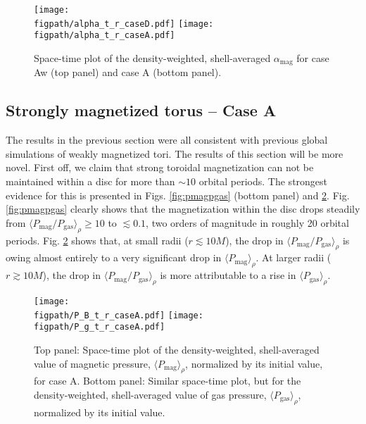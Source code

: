 \documentclass[useAMS,usenatbib]{mn2e}
\newcommand{\figpath}{.}
\def\pm{P_\mathrm{mag}}
\def\pg{P_\mathrm{gas}}
\def\pmpg{P_\mathrm{mag}/P_\mathrm{gas}}
\begin{document}
\begin{figure}
\centering
\texttt{[image: \\figpath/alpha\_t\_r\_caseD.pdf]}
\texttt{[image: \\figpath/alpha\_t\_r\_caseA.pdf]}
\caption{Space-time plot of the density-weighted, shell-averaged $\alpha_\mathrm{mag}$ for case Aw (top panel) and case A (bottom panel).}
\label{fig:alpha}
\end{figure}


\subsection{Strongly magnetized torus -- Case A}

The results in the previous section were all consistent with previous global simulations of weakly magnetized tori.  The results of this section will be more novel.  First off, we claim that strong toroidal magnetization can not be maintained within a disc for more than $\sim 10$ orbital periods.  The strongest evidence for this is presented in Figs. \ref{fig:pmagpgas} (bottom panel) and \ref{fig:pmag}.  Fig. \ref{fig:pmagpgas} clearly shows that the magnetization within the disc drops steadily from $\langle P_\mathrm{mag}/P_\mathrm{gas} \rangle_\rho \ge 10$ to $\lesssim 0.1$, two orders of magnitude in roughly 20 orbital periods.  Fig. \ref{fig:pmag} shows that, at small radii ($r \lesssim 10 M$), the drop in $\langle \pmpg \rangle_\rho$ is owing almost entirely to a very significant drop in $\langle \pm \rangle_\rho$.  At larger radii ($r \gtrsim 10 M$), the drop in $\langle \pmpg \rangle_\rho$ is more attributable to a rise in $\langle \pg \rangle_\rho$.

\begin{figure}
\centering
\texttt{[image: \\figpath/P\_B\_t\_r\_caseA.pdf]}
\texttt{[image: \\figpath/P\_g\_t\_r\_caseA.pdf]}
\caption{Top panel: Space-time plot of the density-weighted, shell-averaged value of magnetic pressure, $\langle P_\mathrm{mag} \rangle_\rho$, normalized by its initial value, for case A.  Bottom panel: Similar space-time plot, but for the density-weighted, shell-averaged value of gas pressure, $\langle P_\mathrm{gas} \rangle_\rho$, normalized by its initial value.}
\label{fig:pmag}
\end{figure}
\end{document}
